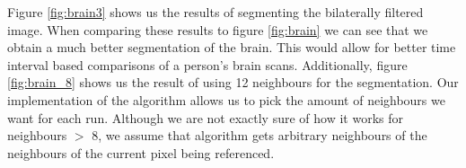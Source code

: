 \documentclass{article}
\begin{document}
\begin{flushleft}
Figure \ref{fig:brain3} shows us the results of segmenting the bilaterally filtered image. When comparing these results to figure \ref{fig:brain} we can see that we obtain a much better segmentation of the brain. This would allow for better time interval based comparisons of a person's brain scans.\newline\newline
Additionally, figure \ref{fig:brain_8} shows us the result of using 12 neighbours for the segmentation. Our implementation of the algorithm allows us to pick the amount of neighbours we want for each run. Although we are not exactly sure of how it works for neighbours $>$ 8, we assume that algorithm gets arbitrary neighbours of the neighbours of the current pixel being referenced.
\end{flushleft}
\end{document}
